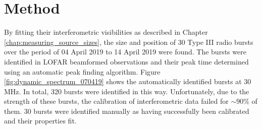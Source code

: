 \section{Method}
\label{sec:obsvtheory_method}
By fitting their interferometric visibilities as described in Chapter \ref{chap:measuring_source_sizes}, the size and position of 30 Type III radio bursts over the period of 04 April 2019 to 14 April 2019 were found. The bursts were identified in LOFAR beamformed observations and their peak time determined using an automatic peak finding algorithm. Figure \ref{fig:dynamic_spectrum_070419} shows the automatically identified bursts at 30 MHz. In total, 320 bursts were identified in this way. Unfortunately, due to the strength of these bursts, the calibration of interferometric data failed for $\sim 90 \%$ of them. 30 bursts were identified manually as having successfully been calibrated and their properties fit.  

